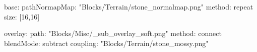 base:
  pathNormapMap: "Blocks/Terrain/stone_normalmap.png"
  method: repeat
  size: [16,16]

overlay:
  path: "Blocks/Misc/_sub_overlay_soft.png"
  method: connect
  blendMode: subtract
  coupling: "Blocks/Terrain/stone_mossy.png"